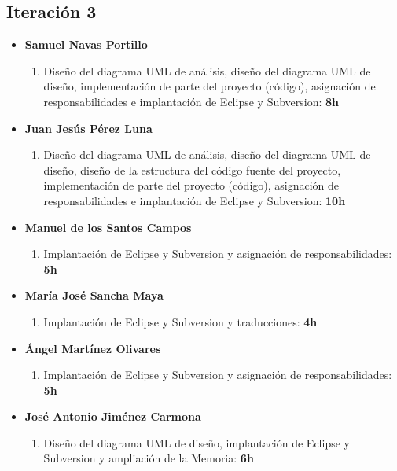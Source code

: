 \documentclass[11 pt]{book}
\begin{document}
	    \subsection*{Iteración 3}
		    \begin{itemize}
			    \item \textbf {Samuel Navas Portillo}
				    \begin{enumerate}
					    \item Diseño del diagrama UML de análisis, diseño del diagrama UML de diseño, implementación de parte del proyecto (código), asignación de responsabilidades e implantación de Eclipse y Subversion: \textbf{8h}
				    \end{enumerate}
			    \item \textbf {Juan Jesús Pérez Luna}
				    \begin{enumerate}
					    \item Diseño del diagrama UML de análisis, diseño del diagrama UML de diseño, diseño de la estructura del código fuente del proyecto, implementación de parte del proyecto (código), asignación de responsabilidades e implantación de Eclipse y Subversion: \textbf{10h}
				    \end{enumerate}
			    \item \textbf {Manuel de los Santos Campos}
				    \begin{enumerate}
					    \item Implantación de Eclipse y Subversion y asignación de responsabilidades: \textbf{5h}
				    \end{enumerate}
			    \item \textbf {María José Sancha Maya}
				    \begin{enumerate}
					    \item Implantación de Eclipse y Subversion y traducciones: \textbf{4h}
				    \end{enumerate}
			    \item \textbf {Ángel Martínez Olivares}
				    \begin{enumerate}
					    \item Implantación de Eclipse y Subversion y asignación de responsabilidades: \textbf{5h}
				    \end{enumerate}
			    \item \textbf {José Antonio Jiménez Carmona}
				    \begin{enumerate}
					    \item Diseño del diagrama UML de diseño, implantación de Eclipse y Subversion y ampliación de la Memoria: \textbf{6h}
				    \end{enumerate}
		    \end{itemize}
\end{document}
